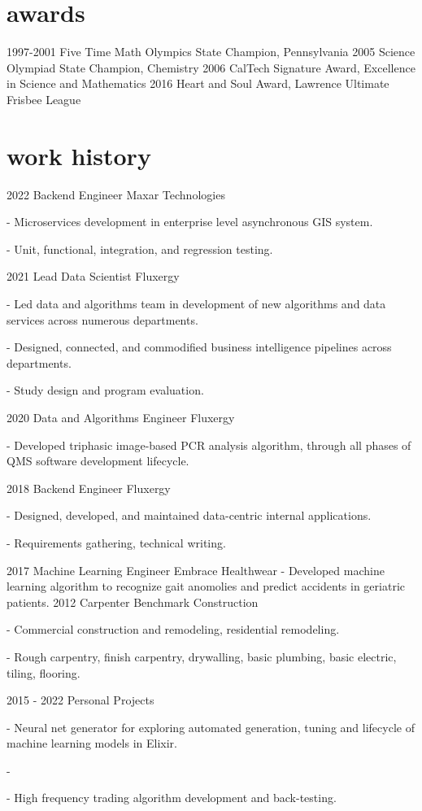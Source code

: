 \documentclass[]{twentysecondcv}
\begin{document}

\section{awards}

\begin{twentyshort}
  \twentyitemshort
    {1997-2001}
	{Five Time Math Olympics State Champion, Pennsylvania}
  \twentyitemshort
    {2005}
    {Science Olympiad State Champion, Chemistry}
  \twentyitemshort
    {2006}
    {CalTech Signature Award, Excellence in Science and Mathematics}
  \twentyitemshort
    {2016}
    {Heart and Soul Award, Lawrence Ultimate Frisbee League}
\end{twentyshort}


\section{work history}

\begin{twenty}
  \twentyitem
    {2022}
    {Backend Engineer}
    {Maxar Technologies}
    {- Microservices development in enterprise level asynchronous GIS system. 

	- Unit, functional, integration, and regression testing.

}

  \twentyitem
    {2021}
    {Lead Data Scientist}
    {Fluxergy}
    {- Led data and algorithms team in development of new algorithms and data services across numerous departments.

	- Designed, connected, and commodified business intelligence pipelines across departments.

	- Study design and program evaluation.
	} 
  \twentyitem
    {2020}
    {Data and Algorithms Engineer}
    {Fluxergy}
    {- Developed triphasic image-based PCR analysis algorithm, through all phases of QMS software development lifecycle.

	} 
  \twentyitem
    {2018}
    {Backend Engineer}
    {Fluxergy}
    {- Designed, developed, and maintained data-centric internal applications.

	- Requirements gathering, technical writing.
	} 
  \twentyitem
    {2017}
    {Machine Learning Engineer}
    {Embrace Healthwear}
    {- Developed machine learning algorithm to recognize gait anomolies and predict accidents in geriatric patients.
	} 
  \twentyitem
    {2012}
    {Carpenter}
    {Benchmark Construction}
    {- Commercial construction and remodeling, residential remodeling.

	- Rough carpentry, finish carpentry, drywalling, basic plumbing, basic electric, tiling, flooring.
	} 
  \twentyitem
    {2015 - 2022}
    {Personal Projects}
    {}
    {- Neural net generator for exploring automated generation, tuning and lifecycle of machine learning models in Elixir.

    - 

	- High frequency trading algorithm development and back-testing.} 
\end{twenty}
\end{document}
